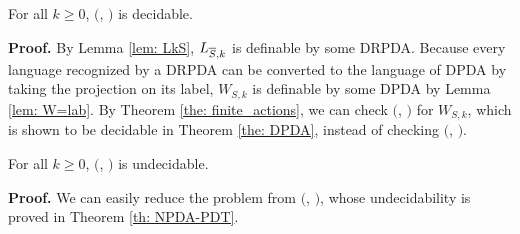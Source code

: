 \begin{theorem}
For all $k\geq 0$, \Real $($\DRPDAv, \RPDTk$)$ is decidable.
\end{theorem}
{\bf Proof.}\quad
By Lemma \ref{lem: LkS}, $L_{{\overline{S}},k}$ is definable by some DRPDA.
Because every language recognized by a DRPDA can be converted to
the language of DPDA by taking the projection on its label,
$W_{S,k}$ is definable by some DPDA by Lemma \ref{lem: W=lab}.
By Theorem \ref{the: finite_actions}, we can check \Real $($\DPDA, \PDT$)$ for $W_{S,k}$, which is shown to be decidable in Theorem \ref{the: DPDA}, instead of checking \Real $($\DRPDAv, \RPDTk$)$.

\begin{theorem}
For all $k\geq 0$, \Real $($\NRPDA, \RPDTk$)$ is undecidable.
\end{theorem}
{\bf Proof.}\quad
We can easily reduce the problem from \Real $($\NPDA, \PDT$)$,
whose undecidability is proved in Theorem \ref{th: NPDA-PDT}.


